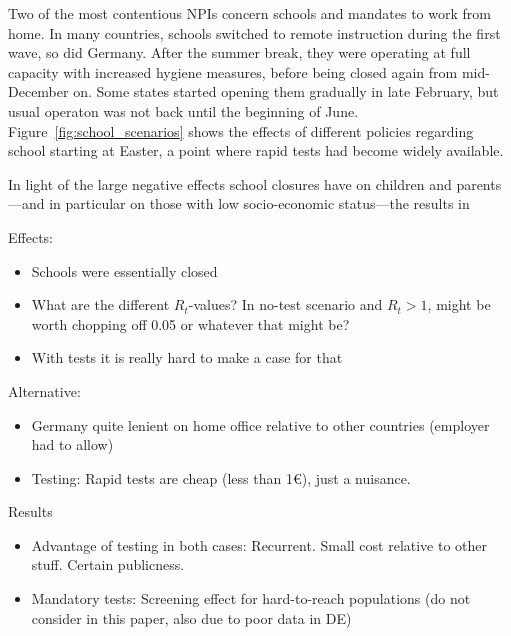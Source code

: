 Two of the most contentious NPIs concern schools and mandates to work from home. In many
countries, schools switched to remote instruction during the first wave, so did Germany.
After the summer break, they were operating at full capacity with increased hygiene
measures, before being closed again from mid-December on. Some states started opening
them gradually in late February, but usual operaton was not back until the beginning of
June. Figure~\ref{fig:school_scenarios} shows the effects of different policies regarding school starting at Easter, a point where rapid tests had become widely available. 

In light of the large negative effects school closures have on children and
parents---and in particular on those with low
socio-economic status---the results in

Effects:
\begin{itemize}
    \item Schools were essentially closed
    \item What are the different $R_t$-values? In no-test scenario and $R_t>1$, might be
          worth chopping off 0.05 or whatever that might be?
    \item With tests it is really hard to make a case for that
\end{itemize}

Alternative:
\begin{itemize}
    \item Germany quite lenient on home office relative to other countries (employer had
          to allow)
    \item Testing: Rapid tests are cheap (less than 1\euro), just a nuisance.
\end{itemize}

Results
\begin{itemize}
    \item Advantage of testing in both cases: Recurrent. Small cost relative to other
          stuff. Certain publicness.
    \item Mandatory tests: Screening effect for hard-to-reach populations (do not
          consider in this paper, also due to poor data in DE)
\end{itemize}


